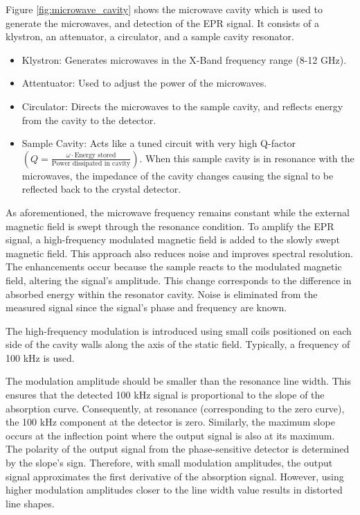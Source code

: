 \documentclass{article}
\begin{document}
Figure \ref{fig:microwave_cavity} shows the microwave cavity which is used to generate the microwaves, and detection of the EPR signal. 
It consists of a klystron, an attenuator, a circulator, and a sample cavity resonator.

\begin{itemize}
  \item Klystron: Generates microwaves in the X-Band frequency range (8-12 GHz).
  \item Attentuator: Used to adjust the power of the microwaves.
  \item Circulator: Directs the microwaves to the sample cavity, and reflects energy from the cavity to the detector.
  \item Sample Cavity: Acts like a tuned circuit with very high Q-factor $\left(Q=\frac{\omega \cdot \text{Energy stored}}{\text{Power dissipated in cavity}}\right)$. When this sample cavity is in resonance with the microwaves, the impedance of the cavity changes causing the signal to be reflected back to the crystal detector.
\end{itemize}

As aforementioned, the microwave frequency remains constant while the external magnetic field is swept through the resonance condition. To amplify the EPR signal, a high-frequency modulated magnetic field is added to the slowly swept magnetic field. This approach also reduces noise and improves spectral resolution. The enhancements occur because the sample reacts to the modulated magnetic field, altering the signal's amplitude. This change corresponds to the difference in absorbed energy within the resonator cavity. Noise is eliminated from the measured signal since the signal's phase and frequency are known.

The high-frequency modulation is introduced using small coils positioned on each side of the cavity walls along the axis of the static field. Typically, a frequency of 100 kHz is used.

The modulation amplitude should be smaller than the resonance line width. This ensures that the detected 100 kHz signal is proportional to the slope of the absorption curve. Consequently, at resonance (corresponding to the zero curve), the 100 kHz component at the detector is zero. Similarly, the maximum slope occurs at the inflection point where the output signal is also at its maximum. The polarity of the output signal from the phase-sensitive detector is determined by the slope's sign. Therefore, with small modulation amplitudes, the output signal approximates the first derivative of the absorption signal. However, using higher modulation amplitudes closer to the line width value results in distorted line shapes.
\end{document}
